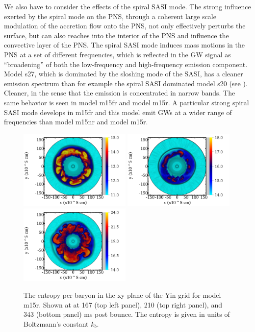 We also have to consider the effects of the spiral SASI mode.
The strong influence exerted by the spiral mode on the PNS, through a coherent large scale
modulation of the accretion flow onto the PNS, not only effectively perturbs the surface, 
but can also reaches into the interior of the PNS and influence the convective layer of the PNS.
The spiral SASI mode induces mass motions in the PNS at a set of different frequencies, which is 
reflected in the GW signal as ``broadening'' of both the low-frequency and high-frequency
emission component. Model s27, which is dominated by the sloshing mode of the SASI,
has a cleaner emission spectrum than for example the spiral SASI dominated model s20 (see ). Cleaner, in the sense
that the emission is concentrated in narrow bands. The same behavior is seen in model m15fr and
model m15r. A particular strong spiral SASI mode develops in m15fr and this model emit GWs at a
wider range of frequencies than model m15nr and model m15r. 
\begin{figure}[ht]         
\centering                            
\includegraphics[width=0.49\textwidth]{./images/paper2/1.png}
\includegraphics[width=0.49\textwidth]{./images/paper2/2.png} \\
\includegraphics[width=0.49\textwidth]{./images/paper2/3.png}
\caption{The entropy per baryon in the xy-plane of the Yin-grid for model m15r. Shown at
at 167 (top left panel), 210 (top right panel), and 343 (bottom panel) ms post bounce. 
The entropy is given in units of Boltzmann's constant $k_b$. \label{figp2:sto}}
\end{figure}
